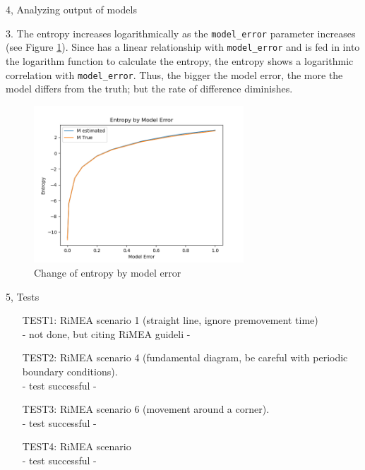 \documentclass[10pt,a4paper]{article}
\begin{document}
\begin{task}{4, Analyzing output of models}

3. The entropy increases logarithmically as the \texttt{model\_error} parameter increases (see Figure \ref{fig:entropy_change_task4}). Since  has a linear relationship with \texttt{model\_error} and  is fed in into the logarithm function to calculate the entropy, the entropy shows a logarithmic correlation with \texttt{model\_error}. Thus, the bigger the model error, the more the model differs from the truth; but the rate of difference diminishes. 

\begin{figure}[H]
    \centering
    \includegraphics[width=0.7\textwidth]{pictures/task4_entropy.png}
    \caption{Change of entropy by model error}
    \label{fig:entropy_change_task4}
\end{figure}

\end{task}
\begin{task}{5, Tests}
\begin{enumerate}
\item[TEST1:] RiMEA scenario 1 (straight line, ignore premovement time)\\
- not done, but citing RiMEA guideli -
\item[TEST2:] RiMEA scenario 4 (fundamental diagram, be careful with periodic boundary conditions).\\
- test successful - 
\item[TEST3:] RiMEA scenario 6 (movement around a corner).\\
- test successful - 
\item[TEST4:] RiMEA scenario\\
- test successful - 
\end{enumerate}
\end{task}



\end{document}

